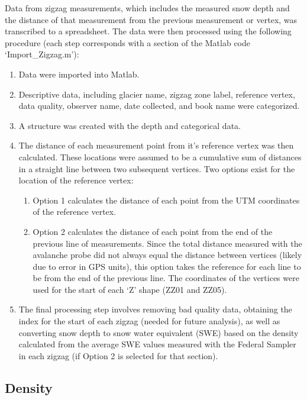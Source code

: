 \documentclass[12pt]{article}
\begin{document}
Data from zigzag measurements, which includes the measured snow depth and the distance of that measurement from the previous measurement or vertex, was transcribed to a spreadsheet. The data were then processed using the following procedure (each step corresponds with a section of the Matlab code `Import\_Zigzag.m'):
\begin{enumerate}
\item Data were imported into Matlab.
\item Descriptive data, including glacier name, zigzag zone label, reference vertex, data quality, observer name, date collected, and book name were categorized.
\item A structure was created with the depth and categorical data.
\item The distance of each measurement point from it's reference vertex was then calculated. These locations were assumed to be a cumulative sum of distances in a straight line between two subsequent vertices. Two options exist for the location of the reference vertex:
 	\begin{enumerate}
	\item Option 1 calculates the distance of each point from the UTM coordinates of the reference vertex.
	\item Option 2 calculates the distance of each point from the end of the previous line of measurements. Since the total distance measured with the avalanche probe did not always equal the distance between vertices (likely due to error in GPS units), this option takes the reference for each line to be from the end of the previous line. The coordinates of the vertices were used for the start of each `Z' shape (ZZ01 and ZZ05).
	\end{enumerate}
\item The final processing step involves removing bad quality data, obtaining the index for the start of each zigzag (needed for future analysis), as well as converting snow depth to snow water equivalent (SWE) based on the density calculated from the average SWE values measured with the Federal Sampler in each zigzag (if Option 2 is selected for that section).  
\end{enumerate}

\subsection{Density}
\end{document}
